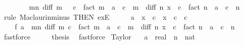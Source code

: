 \begin{isabellebody}
\ \ \ \ \ \ \ \ {\isacharparenleft}{\kern0pt}{\isasymSum}m{\isacharless}{\kern0pt}n{\isachardot}{\kern0pt}\ diff\ m\ {\isacharparenleft}{\kern0pt}{}\ {\isacharplus}{\kern0pt}\ c{\isacharparenright}{\kern0pt}\ {\isacharslash}{\kern0pt}\ fact\ m\ {\isacharasterisk}{\kern0pt}\ {\isacharparenleft}{\kern0pt}a\ {\isacharminus}{\kern0pt}\ c{\isacharparenright}{\kern0pt}\ {\isacharcircum}{\kern0pt}\ m{\isacharparenright}{\kern0pt}\ {\isacharplus}{\kern0pt}\ diff\ n\ {\isacharparenleft}{\kern0pt}x\ {\isacharplus}{\kern0pt}\ c{\isacharparenright}{\kern0pt}\ {\isacharslash}{\kern0pt}\ fact\ n\ {\isacharasterisk}{\kern0pt}\ {\isacharparenleft}{\kern0pt}a\ {\isacharminus}{\kern0pt}\ c{\isacharparenright}{\kern0pt}\ {\isacharcircum}{\kern0pt}\ n{\isachardoublequoteclose}\isanewline
\ \ \ \ \isamarkupfalse%
\ {\isacharparenleft}{\kern0pt}rule\ Maclaurin{\isacharunderscore}{\kern0pt}minus\ {\isacharbrackleft}{\kern0pt}THEN\ exE{\isacharbrackright}{\kern0pt}{\isacharparenright}{\kern0pt}\isanewline
\ \ \isamarkupfalse%
\ \isamarkupfalse%
\ {\isachardoublequoteopen}a\ {\isacharless}{\kern0pt}\ x\ {\isacharplus}{\kern0pt}\ c\ {\isasymand}\ x\ {\isacharplus}{\kern0pt}\ c\ {\isacharless}{\kern0pt}\ c\ {\isasymand}\isanewline
\ \ \ \ f\ a\ {\isacharequal}{\kern0pt}\ {\isacharparenleft}{\kern0pt}{\isasymSum}m{\isacharless}{\kern0pt}n{\isachardot}{\kern0pt}\ diff\ m\ c\ {\isacharslash}{\kern0pt}\ fact\ m\ {\isacharasterisk}{\kern0pt}\ {\isacharparenleft}{\kern0pt}a\ {\isacharminus}{\kern0pt}\ c{\isacharparenright}{\kern0pt}\ {\isacharcircum}{\kern0pt}\ m{\isacharparenright}{\kern0pt}\ {\isacharplus}{\kern0pt}\ diff\ n\ {\isacharparenleft}{\kern0pt}x\ {\isacharplus}{\kern0pt}\ c{\isacharparenright}{\kern0pt}\ {\isacharslash}{\kern0pt}\ fact\ n\ {\isacharasterisk}{\kern0pt}\ {\isacharparenleft}{\kern0pt}a\ {\isacharminus}{\kern0pt}\ c{\isacharparenright}{\kern0pt}\ {\isacharcircum}{\kern0pt}\ n{\isachardoublequoteclose}\isanewline
\ \ \ \ \isamarkupfalse%
\ fastforce\isanewline
\ \ \isamarkupfalse%
\ \isamarkupfalse%
\ {\isacharquery}{\kern0pt}thesis\ \isamarkupfalse%
\ fastforce\isanewline
{}\isamarkupfalse%
%
\endisatagproof
{\isafoldproof}%
%
\isadelimproof
\isanewline
%
\endisadelimproof
\isanewline
{}\isamarkupfalse%
\ Taylor{\isacharcolon}{\kern0pt}\isanewline
\ \ \ a\ {\isacharcolon}{\kern0pt}{\isacharcolon}{\kern0pt}\ real\ \ n\ {\isacharcolon}{\kern0pt}{\isacharcolon}{\kern0pt}\ nat\isanewline

\end{isabellebody}
